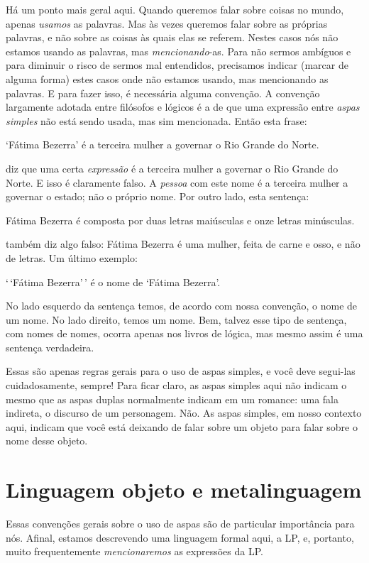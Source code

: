 Há um ponto mais geral aqui.
Quando queremos falar sobre coisas no mundo, apenas \emph{usamos} as palavras.
Mas às vezes queremos falar sobre as próprias palavras, e não sobre as coisas às quais elas se referem.
Nestes casos nós não estamos usando as palavras, mas \emph{mencionando}-as.
Para não sermos ambíguos e para diminuir o risco de sermos mal entendidos, precisamos indicar (marcar de alguma forma) estes casos onde não estamos usando, mas mencionando as palavras. 
E para fazer isso, é necessária alguma convenção.
A convenção largamente adotada entre filósofos e lógicos é a de que uma expressão entre \emph{aspas simples} não está sendo usada, mas sim mencionada.
Então esta frase:
	\begin{ebullet}
		\item `Fátima Bezerra' é a terceira mulher a governar o Rio Grande do Norte.
	\end{ebullet}
diz que uma certa \emph{expressão} é a terceira mulher a governar o Rio Grande do Norte.
E isso é claramente falso.
A \emph{pessoa} com este nome é a terceira mulher a governar o estado; não o próprio nome.
Por outro lado, esta sentença:
	\begin{ebullet}
		\item Fátima Bezerra é composta por duas letras maiúsculas e onze letras minúsculas.
	\end{ebullet}
também diz algo falso:
Fátima Bezerra é uma mulher, feita de carne e osso, e não de letras.
Um último exemplo:
	\begin{ebullet}
		\item `\,`Fátima Bezerra'\,' é o nome de `Fátima Bezerra'.
	\end{ebullet} 
No lado esquerdo da sentença temos, de acordo com nossa convenção, o nome de um nome.
No lado direito, temos um nome.
Bem, talvez esse tipo de sentença, com nomes de nomes, ocorra apenas nos livros de lógica, mas mesmo assim é uma sentença verdadeira.

Essas são apenas regras gerais para o uso de aspas simples, e você deve segui-las cuidadosamente, sempre!
Para ficar claro, as aspas simples aqui não indicam o mesmo que as aspas duplas normalmente indicam em um romance:
uma fala indireta, o discurso de um personagem.
Não.
As aspas simples, em nosso contexto aqui, indicam que você está deixando de falar sobre um objeto para falar sobre o nome desse objeto.


\section{Linguagem objeto e metalinguagem}\label{s:LingObjMeta}
Essas convenções gerais sobre o uso de aspas são de particular importância para nós.
Afinal, estamos descrevendo uma linguagem formal aqui, a LP, e, portanto, muito frequentemente \emph{mencionaremos} as expressões da LP.

